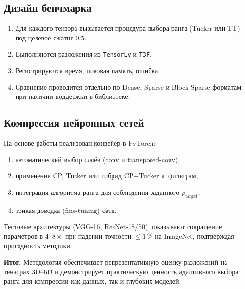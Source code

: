 \subsection*{Дизайн бенчмарка}
\begin{enumerate}\setlength\itemsep{0.15em}
    \item Для каждого тензора вызывается процедура выбора ранга (Tucker или TT) под целевое сжатие $0.5$.  
    \item Выполняются разложения из \texttt{TensorLy} и \texttt{T3F}.  
    \item Регистрируются время, пиковая память, ошибка.  
    \item Сравнение проводится отдельно по Dense, Sparse и Block-Sparse форматам при наличии поддержки в библиотеке.
\end{enumerate}

\subsection*{Компрессия нейронных сетей}
На основе работы \cite{stable_low_rank_tensor_decomposition} реализован конвейер в PyTorch:
\begin{enumerate}\setlength\itemsep{0.15em}
    \item автоматический выбор слоёв (conv и transposed-conv),  
    \item применение CP, Tucker или гибрид CP+Tucker к~фильтрам,  
    \item интеграция алгоритма ранга для соблюдения заданного $\rho_{\text{target}}$,  
    \item тонкая доводка (fine-tuning) сети.  
\end{enumerate}
Тестовые архитектуры (VGG-16, ResNet-18/50) показывают сокращение параметров в $4$–$8\times$ при падении точности ${\le}1{\,}\%$ на ImageNet, подтверждая пригодность методики.

\textbf{Итог.} Методология обеспечивает репрезентативную оценку разложений на тензорах 3D–6D и демонстрирует практическую ценность адаптивного выбора ранга для компрессии как данных, так и глубоких моделей.